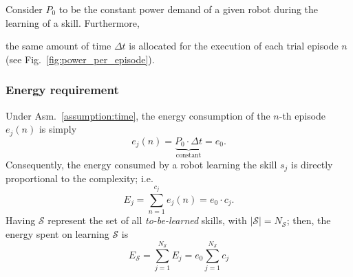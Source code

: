 Consider $P_0$ to be the constant power demand of a given robot during the learning of a skill. Furthermore,%
\begin{tcolorbox}
	\begin{assumption}\label{assumption:time}
		the same amount of time $\Delta t$ is allocated for the execution of each trial episode $n$ (see Fig.~\ref{fig:power_per_episode}).
	\end{assumption}
\end{tcolorbox}
\subsubsection{\textbf{Energy requirement}}
Under Asm.~\ref{assumption:time}, the energy consumption of the $n$-th episode $e_j(n)$ is simply
\begin{equation}\label{eq:energy_per_episode}
    e_j(n) = \underbrace{P_0\cdot \Delta t}_{\text{constant}} = e_0.
\end{equation}
Consequently, the energy consumed by a robot learning the skill $ s_j $ is directly proportional to the complexity; i.e.
\begin{equation}\label{eq:energy_per_skill}
    E_j =\sum_{n=1}^{c_j} e_j(n) = e_0 \cdot c_j.
\end{equation}
Having $\mathcal{S}$ represent the set of all \emph{to-be-learned} skills, with $|\mathcal{S}| = N_\mathcal{S}$; then, the energy spent on learning $\mathcal{S}$ is
\begin{equation}\label{eq:total_energy}
	E_{\mathcal{S}} = \sum_{j=1}^{{N_{\mathcal{S}}}} E_j = e_0 \sum_{j=1}^{{N_{\mathcal{S}}}} c_j%
\end{equation}
